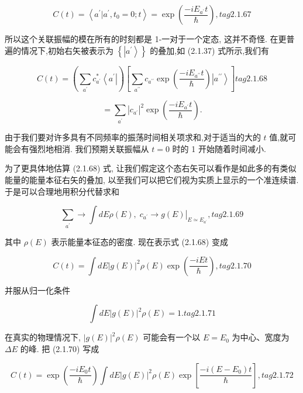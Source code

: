 \documentclass[lang=cn,newtx,10pt,scheme=chinese,thmcnt=section]{elegantbook}
\begin{document}
$$
C\left( t\right) = \left\langle {{a}^{\prime } | {a}^{\prime },{t}_{0} = 0;t}\right\rangle = \exp \left( \frac{-i{E}_{{a}^{\prime }}t}{\hbar }\right) , tag{2.1.67}
$$

所以这个关联振幅的模在所有的时刻都是 1-一对于一个定态, 这并不奇怪. 在更普遍的情况下,初始右矢被表示为 $\left\{ \left| {a}^{\prime }\right\rangle \right\}$ 的叠加,如 (2.1.37) 式所示,我们有

$$
C\left( t\right) = \left( {\mathop{\sum }\limits_{{a}^{\prime }}{c}_{{a}^{\prime }}^{ * }\left\langle {a}^{\prime }\right| }\right) \left\lbrack {\mathop{\sum }\limits_{{a}^{\prime \prime }}{c}_{{a}^{\prime \prime }}\exp \left( \frac{-i{E}_{{a}^{\prime \prime }}t}{\hbar }\right) \left| {a}^{\prime \prime }\right\rangle }\right\rbrack tag{2.1.68}
$$

$$
= \mathop{\sum }\limits_{{a}^{\prime }}{\left| {c}_{{a}^{\prime }}\right| }^{2}\exp \left( \frac{-i{E}_{{a}^{\prime }}t}{\hbar }\right) .
$$

由于我们要对许多具有不同频率的振荡时间相关项求和,对于适当的大的 $t$ 值,就可能会有强烈地相消. 我们预期关联振幅从 $t = 0$ 时的 1 开始随着时间减小.

为了更具体地估算 (2.1.68) 式, 让我们假定这个态右矢可以看作是如此多的有类似能量的能量本征右矢的叠加, 以至我们可以把它们视为实质上显示的一个准连续谱. 于是可以合理地用积分代替求和

$$
\mathop{\sum }\limits_{{a}^{\prime }} \rightarrow \int {dE\rho }\left( E\right) ,{\left. \;{c}_{{a}^{\prime }} \rightarrow g\left( E\right) \right| }_{E \simeq {E}_{{a}^{\prime }}}, tag{2.1.69}
$$

其中 $\rho \left( E\right)$ 表示能量本征态的密度. 现在表示式 (2.1.68) 变成

$$
C\left( t\right) = \int {dE}{\left| g\left( E\right) \right| }^{2}\rho \left( E\right) \exp \left( \frac{-{iEt}}{\hbar }\right) , tag{2.1.70}
$$

并服从归一化条件

$$
\int {dE}{\left| g\left( E\right) \right| }^{2}\rho \left( E\right) = 1. tag{2. 1.71}
$$

在真实的物理情况下, ${\left| g\left( E\right) \right| }^{2}\rho \left( E\right)$ 可能会有一个以 $E = {E}_{0}$ 为中心、宽度为 ${\Delta E}$ 的峰. 把 (2.1.70) 写成

$$
C\left( t\right) = \exp \left( \frac{-i{E}_{0}t}{\hbar }\right) \int {dE}{\left| g\left( E\right) \right| }^{2}\rho \left( E\right) \exp \left\lbrack \frac{-i\left( {E - {E}_{0}}\right) t}{\hbar }\right\rbrack , tag{2.1.72}
$$
\end{document}
